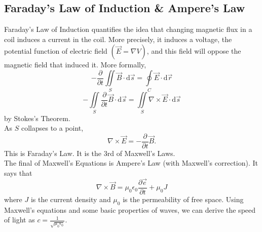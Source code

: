 \subsection{Faraday's Law of Induction \& Ampere's Law}
\noindent
Faraday’s Law of Induction quantifies the idea that changing magnetic flux in a coil induces a current in the coil. More precisely, it induces a voltage, the potential function of electric field $\left(\vec{E} = \nabla V\right)$, and this field will oppose the magnetic field that induced it. More formally,
\begin{equation*}
	-\frac{\partial}{\partial t}\iint\limits_{S}{\vec{B} \cdot \mathrm{d}\vec{s}} = \oint\limits_{C}{\vec{E} \cdot \mathrm{d}\vec{r}}
\end{equation*}
\begin{equation*}
	-\iint\limits_{S}{\frac{\partial}{\partial t}\vec{B} \cdot \mathrm{d}\vec{s}} = \iint\limits_{S}{\nabla \times \vec{E} \cdot \mathrm{d}\vec{s}}
\end{equation*}
by Stokes's Theorem.\\
As $S$ collapses to a point,
\begin{equation*}
	\nabla \times \vec{E} = -\frac{\partial}{\partial t}\vec{B}.
\end{equation*} 
This is Faraday's Law. It is the 3rd of Maxwell's Laws.\\

\noindent
The final of Maxwell's Equations is Ampere's Law (with Maxwell's correction). It says that 
\begin{equation*}
	\nabla \times \vec{B} = \mu_0\epsilon_0\frac{\partial\vec{e}}{\partial t} + \mu_0J
\end{equation*}
where $J$ is the current density and $\mu_0$ is the permeability of free space. Using Maxwell's equations and some basic properties of waves, we can derive the speed of light as $c = \frac{1}{\sqrt{\mu_0\epsilon_0}}$.
